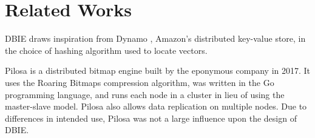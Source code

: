 \section{Related Works}
DBIE draws inspiration from Dynamo \cite{decandia2007}, Amazon's distributed
key-value store, in the choice of hashing algorithm used to locate vectors.
\par
Pilosa \cite{pilosa} is a distributed bitmap engine built by the eponymous
company in 2017. It uses the Roaring Bitmaps \cite{roaring} compression
algorithm, was written in the Go programming language, and runs each node in a
cluster in lieu of using the master-slave model. Pilosa also allows data
replication on multiple nodes. Due to differences in intended use,
Pilosa was not a large influence upon the design of DBIE.
